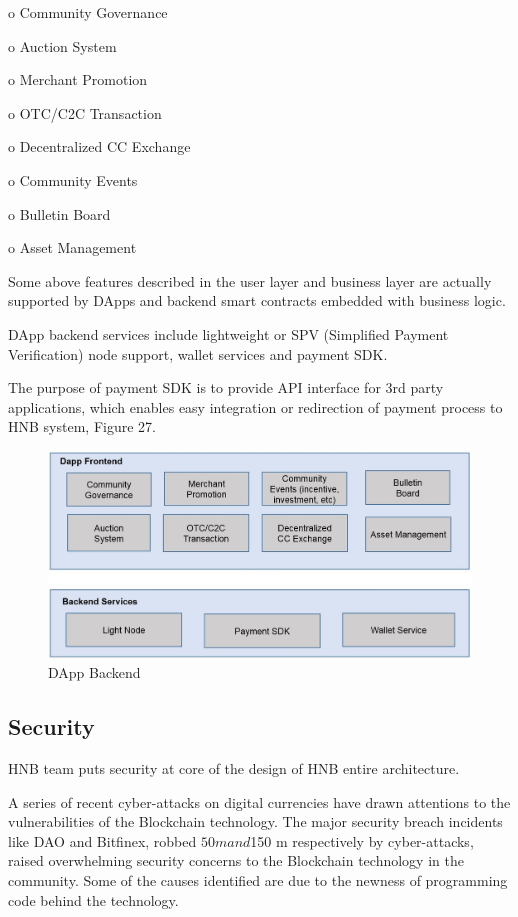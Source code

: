 \documentclass[fleqn,10pt]{SelfArx} %
\begin{document}
o	Community Governance

o	Auction System

o	Merchant Promotion

o	OTC/C2C Transaction

o	Decentralized CC Exchange

o	Community Events

o	Bulletin Board

o	Asset Management

Some above features described in the user layer and business layer are actually supported by DApps and backend smart contracts embedded with business logic. \\
	

DApp backend services include lightweight or SPV (Simplified Payment Verification) node support, wallet services and payment SDK. 

The purpose of payment SDK is to provide API interface for 3rd party applications, which enables easy integration or redirection of payment process to HNB system, Figure 27.

\begin{figure}[ht]\centering %
\includegraphics[width=\linewidth]{28}
\caption{DApp Backend}
\label{fig:28}
\end{figure}

\subsection{Security}

HNB team puts security at core of the design of HNB entire architecture.

A series of recent cyber-attacks on digital currencies have drawn attentions to the vulnerabilities of the Blockchain technology. The major security breach incidents like DAO and Bitfinex, robbed $50 m and $150 m respectively by cyber-attacks, raised overwhelming security concerns to the Blockchain technology in the community. Some of the causes identified are due to the newness of programming code behind the technology. 
\end{document}

